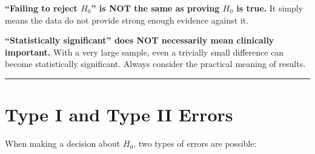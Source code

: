 \documentclass[
  12pt,
  letterpaper,
]{book}
\begin{document}
\begin{tcolorbox}[enhanced jigsaw, arc=.35mm, bottomrule=.15mm, bottomtitle=1mm, breakable, colback=white, colbacktitle=quarto-callout-warning-color!10!white, colframe=quarto-callout-warning-color-frame, coltitle=black, left=2mm, leftrule=.75mm, opacityback=0, opacitybacktitle=0.6, rightrule=.15mm, title={⚠️ Common Misinterpretations}, titlerule=0mm, toprule=.15mm, toptitle=1mm]

\textbf{``Failing to reject \(H_0\)'' is NOT the same as proving \(H_0\)
is true.} It simply means the data do not provide strong enough evidence
against it.

\textbf{``Statistically significant'' does NOT necessarily mean
clinically important.} With a very large sample, even a trivially small
difference can become statistically significant. Always consider the
practical meaning of results.

\end{tcolorbox}

\begin{center}\rule{0.5\linewidth}{0.5pt}\end{center}

\section{Type I and Type II Errors}\label{type-i-and-type-ii-errors}

When making a decision about \(H_0\), two types of errors are possible:
\end{document}
